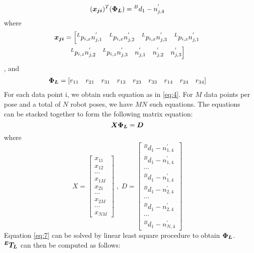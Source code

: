 \begin{equation}
\label{eq:4}
  (\vb*{x_{ji}})  ^T (\vb*{\Phi_L}) = {^B}d_1 -  n^{'}_{j,4}
\end{equation}
where 
\begin{multline}
  \vb*{x_{ji}} = \left[{^L}p_{i,x}n^{'}_{j,1} \quad {^L}p_{i,x}n^{'}_{j,2}\quad {^L}p_{i,x}n^{'}_{j,3}\quad  {^L}p_{i,z}n^{'}_{j,1}\right. \\ 
\left. {^L}p_{i,z}n^{'}_{j,2}\quad {^L}p_{i,z}n^{'}_{j,3} \quad n^{'}_{j,1} \quad n^{'}_{j,2} \quad n^{'}_{j,3} \right]
\end{multline}, 
and
\begin{multline}
  \vb*{\Phi_L} = \left[r_{11} \quad r_{21} \quad r_{31} \quad r_{13} \quad r_{23} \quad r_{33} \quad r_{14} \quad r_{24}  \quad r_{34} \right] 
\end{multline}
For each data point i, we obtain such equation as in \eqref{eq:4}. For $M$ data points per pose and a total of $N$ robot poses, we have $MN$ such equations. The equations can be stacked together to form the following matrix equation:
\begin{equation}
\label{eq:7}
  \vb*{X}   \vb*{\Phi_L} = \vb*{D}
\end{equation}
where 
\begin{equation}
X =\begin{bmatrix}
x_{11} \\ x_{12} \\ \cdots\\x_{1M}\\ x_{21}\\ \cdots\\ x_{2M} \\ \cdots \\ x_{NM}
\end{bmatrix} \;, \; D =\begin{bmatrix}
{^B}d_1 -  n^{'}_{1,4} \\ {^B}d_1 -  n^{'}_{1,4}  \\ \cdots\\ {^B}d_1 -  n^{'}_{1,4}  \\ {^B}d_1 -  n^{'}_{2,4} \\ \cdots\\ {^B}d_1 -  n^{'}_{2,4}  \\ \cdots \\{^B}d_1 -  n^{'}_{N,4} 
\end{bmatrix}
\end{equation}
Equation \eqref{eq:7} can be solved by linear least square procedure to obtain $\vb*{\Phi_L}$. $\vb*{{^E}T_L}$ can then be computed as follows:

